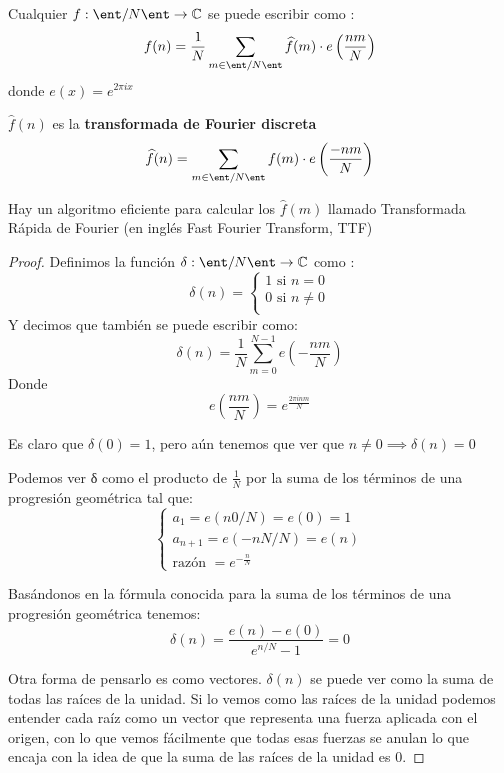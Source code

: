 \begin{theorem}

	Cualquier $f : \ent/N\ent \rightarrow \mathbb{C}$ se puede escribir como :
	$$f(n) = \frac{1}{N}\sum_{m\in \ent/N\ent}\widehat{f}(m)\cdot e\left(\frac{nm}{N}\right)$$
	donde $e(x) = e^{2\pi ix}$

	$\widehat{f}(n)$ es la \textbf{transformada de Fourier discreta}
	$$\widehat{f}(n) = \sum_{m\in \ent/N\ent}f(m)\cdot e\left(\frac{-nm}{N}\right)$$

\end{theorem}
\obs Hay un algoritmo eficiente para calcular los $\widehat{f}(m)$ llamado Transformada Rápida de Fourier (en inglés Fast Fourier Transform, TTF)

\begin{proof}
	Definimos la función $\delta : \ent/N\ent \rightarrow \mathbb{C}$ como :
	$$\delta (n) = \begin{cases}
	1 \text{ si } n=0\\
	0 \text{ si } n\neq 0 \\
	\end{cases}$$
	Y decimos que también se puede escribir como:
	$$\delta (n) = \frac{1}{N} \sum_{m = 0}^{N-1} e\left(-\frac{nm}{N}\right)$$
	Donde
	\[e\left(\frac{nm}{N}\right) = e^{\frac{2\pi inm}{N}}\]

	Es claro que $\delta(0) = 1$, pero aún tenemos que ver que $n\neq 0 \implies \delta (n) = 0$

	Podemos ver δ como el producto de $\frac{1}{N}$ por la suma de los términos de una progresión geométrica tal que:
	\[\begin{cases}
	a_1 = e(n0/N)=e(0)=1\\
	a_{n+1} = e(-nN/N)=e(n)\\
	\text{razón } = e^{-\frac{n}{N}}
	\end{cases}\]

	Basándonos en la fórmula conocida para la suma de los términos de una progresión geométrica tenemos:
	$$\delta (n) =\frac{e(n) - e(0)}{e^{n/N} - 1} = 0$$

	Otra forma de pensarlo es como vectores. $\delta(n)$ se puede ver como la suma de todas las raíces de la unidad. Si lo vemos como las raíces de la unidad podemos entender cada raíz como un vector que representa una fuerza aplicada con el origen, con lo que vemos fácilmente que todas esas fuerzas se anulan lo que encaja con la idea de que la suma de las raíces de la unidad es 0.



\end{proof}
